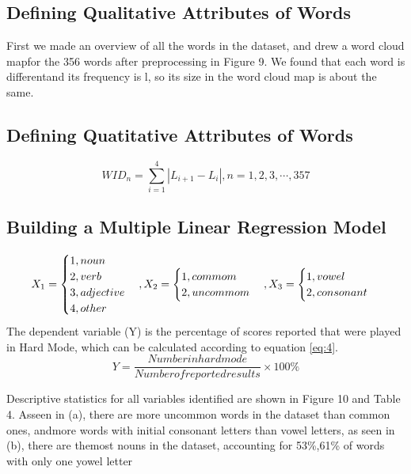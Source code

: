\documentclass[12pt]{ctexart}
\begin{document}
\subsection{Defining Qualitative Attributes of Words}
First we made an overview of all the words in the dataset, and drew a word cloud mapfor the 356 words after preprocessing in Figure 9. We found that each word is differentand its frequency is l, so its size in the word cloud map is about the same.
\subsection{Defining Quatitative Attributes of Words}
\begin{equation}
	WID_n=\sum_{i=1}^{4}|L_{i+1}-L_i|, n=1,2,3,\cdots,357
\end{equation}

\subsection{Building a Multiple Linear Regression Model}

\begin{equation*}
	\centering
	X_1=\begin{cases}1, noun\\2, verb\\3, adjective\\4, other\end{cases}, X_2=\begin{cases}1, commom\\2, uncommom\end{cases}, X_3=\begin{cases}1, vowel\\2, consonant\end{cases}
\end{equation*}
The dependent variable (Y) is the percentage of scores reported that were played in Hard Mode, which can be calculated according to equation \eqref{eq:4}.
\begin{equation}
	Y=\frac{Number in hard mode}{Number of reported results}\times100\%
	\label{eq:4}
\end{equation}

Descriptive statistics for all variables identified are shown in Figure 10 and Table 4. Asseen in (a), there are more uncommon words in the dataset than common ones, andmore words with initial consonant letters than vowel letters, as seen in (b), there are themost nouns in the dataset, accounting for 53\%,61\% of words with only one yowel letter
\end{document}
